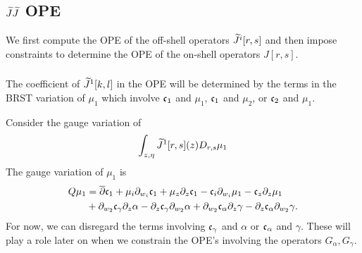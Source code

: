 \documentclass[../main.tex]{subfiles}
\begin{document}
\subsection{$\widetilde J \widetilde J$ OPE} \label{s:JJtree}

We first compute the OPE of the off-shell operators $\widetilde{J}^i[r,s]$ and then impose constraints to determine the OPE of the on-shell operators $J[r,s]$.

\subsubsection{}

The coefficient of $\widetilde{J}^1[k,l]$ in the OPE will be determined by the terms in the BRST variation of $\mu_1$ which involve $\mathfrak{c}_1$ and $\mu_1$, $\mathfrak{c}_1$ and $\mu_2$, or $\mathfrak{c}_2$ and $\mu_1$. 

Consider the gauge variation of 
\begin{equation}\label{eqn:j1vary}
	\int_{z,\eta} \widetilde{J}^1[r,s](z)  D_{r,s} \mu_1 
\end{equation}
The gauge variation of $\mu_1$ is
\begin{align*}
	Q \mu_1 & = \overline{\partial} \mathfrak{c}_1 + \mu_i \partial_{w_i} \mathfrak{c}_1 + \mu_z \partial_{z} \mathfrak{c}_1 - \mathfrak{c}_i \partial_{w_i} \mu_1 - \mathfrak{c}_z \partial_z \mu_1 \\
& + \partial_{w_2} \mathfrak{c}_\gamma\partial_z \alpha -  \partial_z\mathfrak{c}_\gamma \partial_{w_2} \alpha + \partial_{w_2} \mathfrak{c}_\alpha \partial_z \gamma - \partial_z \mathfrak{c}_\alpha \partial_{w_2} \gamma .
\end{align*}
For now, we can disregard the terms involving $\mathfrak{c}_\gamma$ and $\alpha$ or $\mathfrak{c}_\alpha$ and $\gamma$.
These will play a role later on when we constrain the OPE's involving the operators $G_\alpha, G_\gamma$.
\end{document}
